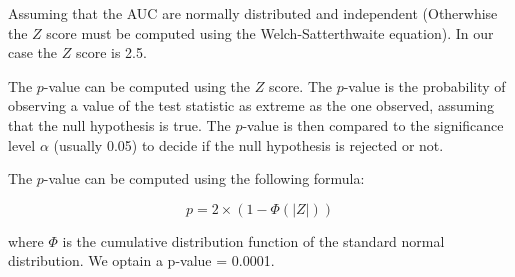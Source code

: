 \documentclass[a4paper,12pt]{article}
\begin{document}
Assuming that the AUC are normally distributed and independent (Otherwhise the $Z$ score must be computed using the Welch-Satterthwaite equation). In our case the $Z$ score is 2.5. \medskip

The $p$-value can be computed using the $Z$ score. The $p$-value is the probability of observing a value of the test statistic as extreme as the one observed, assuming that the null hypothesis is true. The $p$-value is then compared to the significance level $\alpha$ (usually 0.05) to decide if the null hypothesis is rejected or not. \medskip

The $p$-value can be computed using the following formula:

\begin{equation}
    p = 2 \times (1 - \Phi(|Z|))
\end{equation}

where $\Phi$ is the cumulative distribution function of the standard normal distribution. We optain a p-value = 0.0001.\medskip





 
\end{document}
